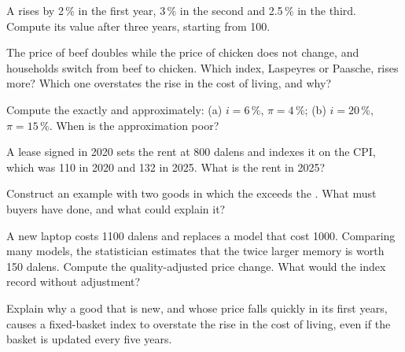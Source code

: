 \begin{exercise}[$\star\star$]\label{exo:g10:price-indices:8}
A  rises by 2\,\% in the first year, 3\,\% in the second and 2.5\,\% in the third. Compute its value after three years, starting from 100.
\end{exercise}

\begin{exercise}[$\star\star$]\label{exo:g10:price-indices:9}
The price of beef doubles while the price of chicken does not change, and households switch from beef to chicken. Which index, Laspeyres or Paasche, rises more?
Which one overstates the rise in the cost of living, and why?
\end{exercise}

\begin{exercise}[$\star\star$]\label{exo:g10:price-indices:10}
Compute the  exactly and approximately: (a) $i = 6\,\%$, $\pi = 4\,\%$; (b) $i = 20\,\%$, $\pi = 15\,\%$. When is the approximation poor?
\end{exercise}

\begin{exercise}[$\star\star$]\label{exo:g10:price-indices:11}
A lease signed in 2020 sets the rent at 800 dalens and indexes it on the CPI, which was 110 in 2020 and 132 in 2025. What is the rent in 2025?
\end{exercise}

\begin{exercise}[$\star\star\star$]\label{exo:g10:price-indices:12}
Construct an example with two goods in which the  exceeds the . What must buyers have done, and what could explain it?
\end{exercise}

\begin{exercise}[$\star\star\star$]\label{exo:g10:price-indices:13}
A new laptop costs 1100 dalens and replaces a model that cost 1000. Comparing many models, the statistician estimates that the twice larger memory is worth 150
dalens. Compute the quality-adjusted price change. What would the index record without adjustment?
\end{exercise}

\begin{exercise}[$\star\star\star$]\label{exo:g10:price-indices:14}
Explain why a good that is new, and whose price falls quickly in its first years, causes a fixed-basket index to overstate the rise in the cost of living, even if the
basket is updated every five years.
\end{exercise}

